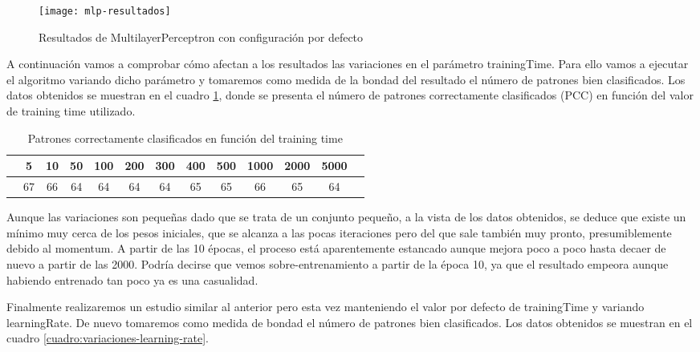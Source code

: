 \begin{figure}[ht]
    \centering
    \texttt{[image: mlp-resultados]}
    \caption{Resultados de MultilayerPerceptron con configuración por defecto}
    \label{fig:mlp-resultados}
\end{figure}

A continuación vamos a comprobar cómo afectan a los resultados las variaciones en el parámetro trainingTime. Para ello vamos a ejecutar el algoritmo variando dicho parámetro y tomaremos como medida de la bondad del resultado el número de patrones bien clasificados. Los datos obtenidos se muestran en el cuadro \ref{cuadro:variaciones-training-time}, donde se presenta el número de patrones correctamente clasificados (PCC) en función del valor de training time utilizado.

\begin{table}[ht]
    \centering
    \begin{tabular}{|r|c|c|c|c|c|c|c|c|c|c|c|c|}
    \hline
    \cellcolor[HTML]{9B9B9B}{\color[HTML]{FFFFFF} Training Time} & 5 & 10 & 50  & 100 & 200 & 300 & 400 & 500 & 1000 & 2000 & 5000  \\ \hline
    \cellcolor[HTML]{9B9B9B}{\color[HTML]{FFFFFF} PCC} & 67 & 66 & 64 & 64 & 64 & 64 & 65 & 65 & 66 & 65 & 64 \\ \hline
    \end{tabular}
    \caption{Patrones correctamente clasificados en función del training time}
    \label{cuadro:variaciones-training-time}
\end{table}

Aunque las variaciones son pequeñas dado que se trata de un conjunto pequeño, a la vista de los datos obtenidos, se deduce que existe un mínimo muy cerca de los pesos iniciales, que se alcanza a las pocas iteraciones pero del que sale también muy pronto, presumiblemente debido al momentum. A partir de las 10 épocas, el proceso está aparentemente estancado aunque mejora poco a poco hasta decaer de nuevo a partir de las 2000. Podría decirse que vemos sobre-entrenamiento a partir de la época 10, ya que el resultado empeora aunque habiendo entrenado tan poco ya es una casualidad.

Finalmente realizaremos un estudio similar al anterior pero esta vez manteniendo el valor por defecto de trainingTime y variando learningRate. De nuevo tomaremos como medida de bondad el número de patrones bien clasificados. Los datos obtenidos se muestran en el cuadro \ref{cuadro:variaciones-learning-rate}.

